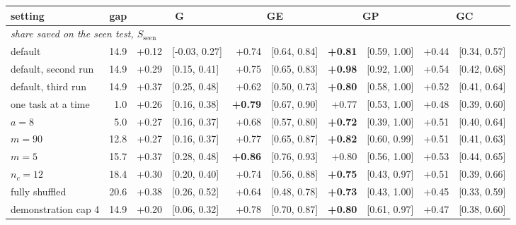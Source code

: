 \begin{tabular}{lrr@{\hspace{0.4em}}lr@{\hspace{0.4em}}lr@{\hspace{0.4em}}lr@{\hspace{0.4em}}l}
\toprule
setting & gap & \multicolumn{2}{c}{G} & \multicolumn{2}{c}{GE} & \multicolumn{2}{c}{GP} & \multicolumn{2}{c}{GC} \\
\midrule
\multicolumn{10}{l}{\emph{share saved on the seen test, $S_{\mathrm{seen}}$}} \\
default & 14.9 & +0.12 & {\scriptsize [-0.03, 0.27]} & +0.74 & {\scriptsize [0.64, 0.84]} & \textbf{+0.81} & {\scriptsize [0.59, 1.00]} & +0.44 & {\scriptsize [0.34, 0.57]} \\
default, second run & 14.9 & +0.29 & {\scriptsize [0.15, 0.41]} & +0.75 & {\scriptsize [0.65, 0.83]} & \textbf{+0.98} & {\scriptsize [0.92, 1.00]} & +0.54 & {\scriptsize [0.42, 0.68]} \\
default, third run & 14.9 & +0.37 & {\scriptsize [0.25, 0.48]} & +0.62 & {\scriptsize [0.50, 0.73]} & \textbf{+0.80} & {\scriptsize [0.58, 1.00]} & +0.52 & {\scriptsize [0.41, 0.64]} \\
one task at a time & 1.0 & +0.26 & {\scriptsize [0.16, 0.38]} & \textbf{+0.79} & {\scriptsize [0.67, 0.90]} & +0.77 & {\scriptsize [0.53, 1.00]} & +0.48 & {\scriptsize [0.39, 0.60]} \\
$a = 8$ & 5.0 & +0.27 & {\scriptsize [0.16, 0.37]} & +0.68 & {\scriptsize [0.57, 0.80]} & \textbf{+0.72} & {\scriptsize [0.39, 1.00]} & +0.51 & {\scriptsize [0.40, 0.64]} \\
$m = 90$ & 12.8 & +0.27 & {\scriptsize [0.16, 0.37]} & +0.77 & {\scriptsize [0.65, 0.87]} & \textbf{+0.82} & {\scriptsize [0.60, 0.99]} & +0.51 & {\scriptsize [0.41, 0.63]} \\
$m = 5$ & 15.7 & +0.37 & {\scriptsize [0.28, 0.48]} & \textbf{+0.86} & {\scriptsize [0.76, 0.93]} & +0.80 & {\scriptsize [0.56, 1.00]} & +0.53 & {\scriptsize [0.44, 0.65]} \\
$n_c = 12$ & 18.4 & +0.30 & {\scriptsize [0.20, 0.40]} & +0.74 & {\scriptsize [0.56, 0.88]} & \textbf{+0.75} & {\scriptsize [0.43, 0.97]} & +0.51 & {\scriptsize [0.39, 0.66]} \\
fully shuffled & 20.6 & +0.38 & {\scriptsize [0.26, 0.52]} & +0.64 & {\scriptsize [0.48, 0.78]} & \textbf{+0.73} & {\scriptsize [0.43, 1.00]} & +0.45 & {\scriptsize [0.33, 0.59]} \\
demonstration cap 4 & 14.9 & +0.20 & {\scriptsize [0.06, 0.32]} & +0.78 & {\scriptsize [0.70, 0.87]} & \textbf{+0.80} & {\scriptsize [0.61, 0.97]} & +0.47 & {\scriptsize [0.38, 0.60]} \\

\end{tabular}
